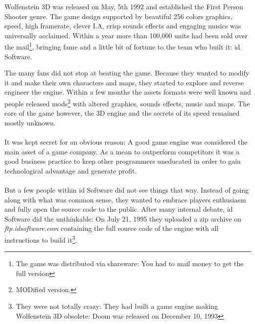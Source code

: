 Wolfenstein 3D was released on May, 5th 1992 and established the First Person Shooter genre. The game design supported by beautiful 256 colors graphics, speed, high framerate, clever I.A, crisp sounds effects and engaging musics was universally acclaimed. Within a year more than 100,000 units had been sold over the mail\footnote{The game was distributed via shareware: You had to mail money to get the full version}, bringing fame and a little bit of fortune to the team who built it: id Software.\\
\par
 \begin{figure}[H]
\centering
{}
\end{figure}
\par
The many fans did not stop at beating the game. Because they wanted to modify it and make their own characters and maps, they started to explore and reverse engineer the engine. Within a few months the assets formats were well known and people released mods\footnote{MODified version.} with altered graphics, sounds effects, music and maps. The core of the game however, the 3D engine and the secrets of its speed remained mostly unknown.\\
\\
It was kept secret for an obvious reason: A good game engine was considered the main asset of a game company. As a mean to outperform competitors it was a good business practice to keep other programmers  uneducated in order to gain technological advantage and generate profit.\\
\\
But a few people within id Software did not see things that way. Instead of going along with what was common sense, they wanted to embrace players enthusiasm and fully open the source code to the public. After many internal debate, id Software did the unthinkable: On July 21, 1995 they uploaded a zip archive on \emph{ftp.idsoftware.com} containing the full source code of the engine with all instructions to build it\footnote{They were not totally crazy: They had built a game engine making Wolfenstein 3D obsolete: Doom was released on December 10, 1993}.\\

